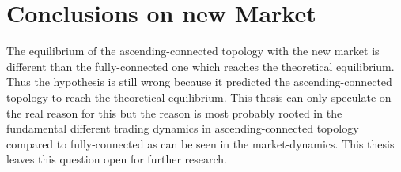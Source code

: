 \documentclass[Bachelorarbeit.tex]{subfiles}
\begin{document}
\section{Conclusions on new Market}
The equilibrium of the ascending-connected topology with the new market is different than the fully-connected one which reaches the theoretical equilibrium. Thus the hypothesis is still wrong because it predicted the ascending-connected topology to reach the theoretical equilibrium. This thesis can only speculate on the real reason for this but the reason is most probably rooted in the fundamental different trading dynamics in ascending-connected topology compared to fully-connected as can be seen in the market-dynamics. This thesis leaves this question open for further research.
\end{document}
